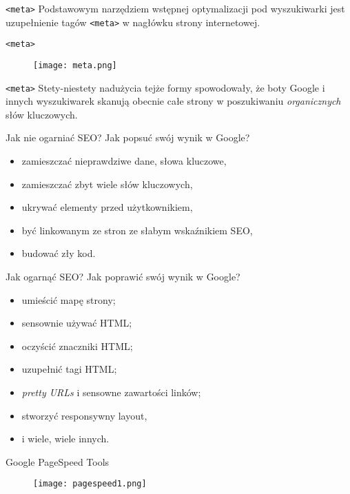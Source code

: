 \begin{frame}{\texttt{<meta>}}
	Podstawowym narzędziem wstępnej optymalizacji pod wyszukiwarki jest uzupełnienie tagów \texttt{<meta>} w nagłówku strony internetowej.
\end{frame}

\begin{frame}{\texttt{<meta>}}
	\begin{figure}[t]
		\centering
		\texttt{[image: meta.png]}
	\end{figure}
\end{frame}

\begin{frame}{\texttt{<meta>}}
	Stety-niestety nadużycia tejże formy spowodowały, że boty Google i innych wyszukiwarek skanują obecnie całe strony w poszukiwaniu \emph{organicznych} słów kluczowych.
\end{frame}

\begin{frame}{Jak nie ogarniać SEO?}
	Jak popsuć swój wynik w Google?
	\begin{itemize}
	\item zamieszczać nieprawdziwe dane, słowa kluczowe,
	\item zamieszczać zbyt wiele słów kluczowych,
	\item ukrywać elementy przed użytkownikiem,
	\item być linkowanym ze stron ze słabym wskaźnikiem SEO,
	\item budować zły kod.
	\end{itemize}
\end{frame}

\begin{frame}{Jak ogarnąć SEO?}
	Jak poprawić swój wynik w Google?
	\begin{itemize}
	\item umieścić mapę strony;
	\item sensownie używać HTML;
	\item oczyścić znaczniki HTML;
	\item uzupełnić tagi HTML;
	\item \emph{pretty URLs} i sensowne zawartości linków;
	\item stworzyć responsywny layout,
	\item i wiele, wiele innych.
	\end{itemize}
\end{frame}

\begin{frame}{Google PageSpeed Tools}
	\begin{figure}[t]
		\centering
		\texttt{[image: pagespeed1.png]}
	\end{figure}
\end{frame}

